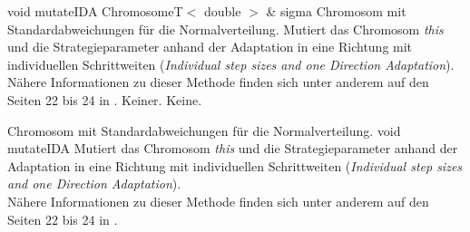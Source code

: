 \documentclass{report}
\begin{document}
\newpage

\setNormalInstance
\printMethodWithOneParam
{void}
{mutateIDA}
{ChromosomeT$<$ double $>$ \&}
{sigma}
{Chromosom mit Standardabweichungen f\"ur die Normalverteilung.}
{Mutiert das Chromosom {\em this} und die Strategieparameter anhand der 
 Adaptation in eine Richtung mit individuellen Schrittweiten
 ({\em Individual step sizes and one Direction Adaptation}).\\
 N\"ahere Informationen zu dieser Methode finden sich unter anderem
 auf den Seiten 22 bis 24 in \cite{EALib}.}
{Keiner.}
{Keine.}

\vspace{4ex}

\setNormalInstance
\setCorrectWidthThree{8pt}
{Chromosom mit Standardabweichungen f\"ur die Normalverteilung.}
\printMethodWithParamsSaved
{void}
{}
{mutateIDA}
{Mutiert das Chromosom {\em this} und die Strategieparameter anhand der 
 Adaptation in eine Richtung mit individuellen Schrittweiten
 ({\em Individual step sizes and one Direction Adaptation}).\\
 N\"ahere Informationen zu dieser Methode finden sich unter anderem
 auf den Seiten 22 bis 24 in \cite{EALib}.}
{}
\setCorrectWidthThree{4pt}
\end{document}
